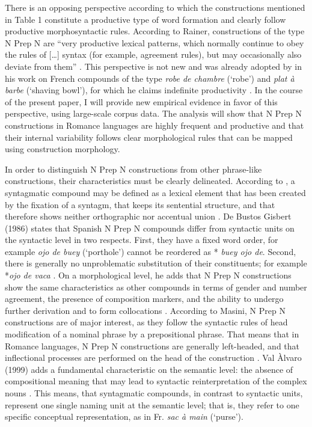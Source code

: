 \documentclass[output=paper]{langsci/langscibook}
\begin{document}
There is an opposing perspective according to which the constructions mentioned in Table 1 constitute a productive type of word formation and clearly follow productive morphosyntactic rules. According to Rainer, constructions of the type N Prep N are “very productive lexical patterns, which normally continue to obey the rules of […] syntax (for example, agreement rules), but may occasionally also deviate from them” \citep[2724]{Rainer:2016}. This perspective is not new and was already adopted by \citet{Benveniste:1974} in his work on French compounds of the type \textit {robe de chambre} (`robe') and \textit {plat à barbe} (`shaving bowl'), for which he claims indefinite productivity \citep[172]{Benveniste:1974}. In the course of the present paper, I will provide new empirical evidence in favor of this perspective, using large-scale corpus data. The analysis will show that N Prep N constructions in Romance languages are highly frequent and productive and that their internal variability follows clear morphological rules that can be mapped using construction morphology.

In order to distinguish N Prep N constructions from other phrase-like constructions, their characteristics must be clearly delineated. According to \citet{BuenafuentesdelaMata:2010}, a syntagmatic compound may be defined as a lexical element that has been created by the fixation of a syntagm, that keeps its sentential structure, and that therefore shows neither orthographic nor accentual union \citep[21ff.]{BuenafuentesdelaMata:2010}. De Bustos Gisbert (1986) states that Spanish N Prep N compounds differ from syntactic units on the syntactic level in two respects. First, they have a fixed word order, for example \textit{ojo de buey} (`porthole') cannot be reordered as * \textit {buey ojo de}. Second, there is generally no unproblematic substitution of their constituents; for example *\textit{ojo de vaca} \citep[4825]{ValAlvaro:1999}. On a morphological level, he adds that N Prep N constructions show the same characteristics as other compounds in terms of gender and number agreement, the presence of composition markers, and the ability to undergo further derivation and to form collocations \citep[77]{BustosGisbert:1986}. According to Masini, N Prep N constructions are of major interest, as they follow the syntactic rules of head modification of a nominal phrase by a prepositional phrase. That means that in Romance languages, N Prep N constructions are generally left-headed, and that inflectional processes are performed on the head of the construction \citep [257]{Masini:2009}. Val Àlvaro (1999) adds a fundamental characteristic on the semantic level: the absence of compositional meaning that may lead to syntactic reinterpretation of the complex nouns \citep[4827]{ValAlvaro:1999}. This means, that syntagmatic compounds, in contrast to syntactic units, represent one single naming unit at the semantic level; that is, they refer to one specific conceptual representation, as in Fr. \textit{sac à main} (`purse').
\end{document}

